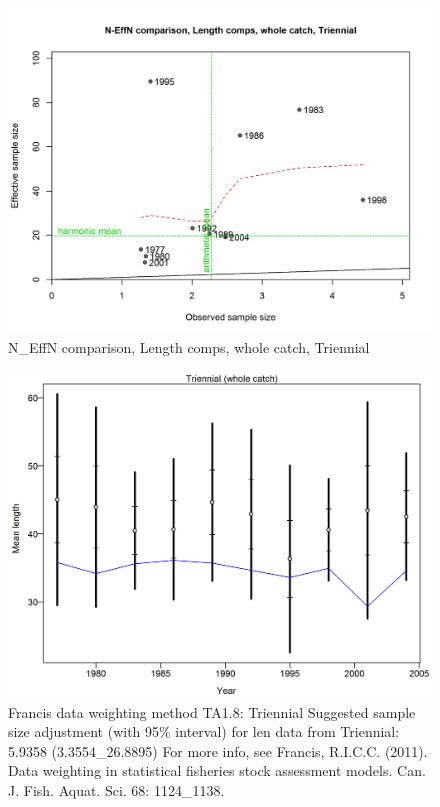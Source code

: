 \documentclass[12pt,]{article}
\begin{document}
\begin{figure}[htbp]
\centering
\includegraphics{./r4ss/plots_mod1/comp_lenfit_sampsize_flt5mkt0.png}
\caption{N\_EffN comparison, Length comps, whole catch, Triennial
\label{fig:mod1_24_comp_lenfit_sampsize_flt5mkt0}}
\end{figure}

\begin{figure}[htbp]
\centering
\includegraphics{./r4ss/plots_mod1/comp_lenfit_data_weighting_TA1.8_Triennial.png}
\caption{Francis data weighting method TA1.8: Triennial Suggested sample
size adjustment (with 95\% interval) for len data from Triennial: 5.9358
(3.3554\_26.8895) For more info, see Francis, R.I.C.C. (2011). Data
weighting in statistical fisheries stock assessment models. Can. J.
Fish. Aquat. Sci. 68: 1124\_1138.
\label{fig:mod1_25_comp_lenfit_data_weighting_TA1.8_Triennial}}
\end{figure}
\end{document}
